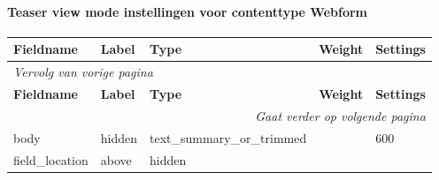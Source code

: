 \paragraph{Teaser view mode instellingen voor contenttype Webform }

  \begin{longtable}{| p{3.00cm}|p{3.00cm}|p{3.00cm}|p{3.00cm}|p{3.00cm}|}
  \hline
  \rowcolor{tableheader}
  \textbf{Fieldname} & \textbf{Label} & \textbf{Type} & \textbf{Weight} & \textbf{Settings}  \tabularnewline
  \hline
\endfirsthead
\multicolumn{5}{l}{\textit{Vervolg van vorige pagina}} \\
\hline
\rowcolor{tableheader}
  \textbf{Fieldname} & \textbf{Label} & \textbf{Type} & \textbf{Weight} & \textbf{Settings}  \tabularnewline
  \hline
\hline
\endhead
\multicolumn{5}{r}{\textit{Gaat verder op volgende pagina}} \\
\endfoot
\hline
\endlastfoot
  body & hidden & text\_summary\_or\_trimmed &   & 600  \tabularnewline
  \hline
  field\_location & above & hidden &   &    \tabularnewline
  \hline
  \end{longtable}
